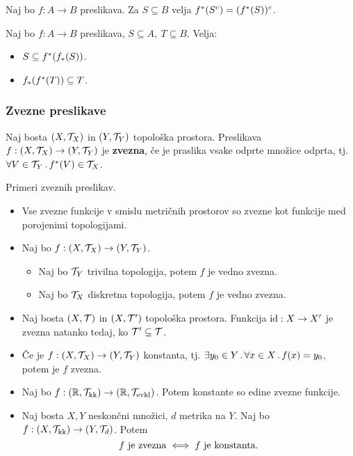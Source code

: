 \begin{trditev}
    Naj bo $f: A \to B$ preslikava. Za $S \subseteq B$ velja $f^{*}(S^c) = (f^{*}(S))^c$.
\end{trditev}

\begin{trditev}
    Naj bo $f: A \to B$ preslikava, $S \subseteq A, \ T \subseteq B$. Velja:
    \begin{itemize}
        \item $S \subseteq f^{*}(f_{*}(S))$.
        \item $f_{*}(f^{*}(T)) \subseteq T$.
    \end{itemize}
\end{trditev}

\subsubsection{Zvezne preslikave}
\begin{definicija}    
    Naj bosta $(X, \mathcal{T}_X)$ in $(Y, \mathcal{T}_Y)$ topološka prostora. Preslikava $f: (X, \mathcal{T}_X) \to (Y, \mathcal{T}_Y)$ je \textbf{zvezna}, če je praslika vsake odprte množice odprta, tj. $\forall V \in \mathcal{T}_Y \,.\, f^{*}(V) \in \mathcal{T}_X$.
\end{definicija}

\begin{primer}
    Primeri zveznih preslikav.
    \begin{itemize}
        \item Vse zvezne funkcije v smislu metričnih prostorov so zvezne kot funkcije med porojenimi topologijami.
        \item Naj bo $f: (X, \mathcal{T}_X) \to (Y, \mathcal{T}_Y)$. 
        \begin{itemize}
            \item Naj bo $\mathcal{T}_Y$ trivilna topologija, potem $f$ je vedno zvezna.
            \item Naj bo $\mathcal{T}_X$ diskretna topologija, potem $f$ je vedno zvezna.
        \end{itemize}
        \item Naj bosta $(X, \mathcal{T})$ in $(X, \mathcal{T}')$ topološka prostora. Funkcija $\operatorname{id}: X \to X'$ je zvezna natanko tedaj, ko $\mathcal{T}' \subseteq \mathcal{T}$.
        \item Če je $f: (X, \mathcal{T}_X) \to (Y, \mathcal{T}_Y)$ konstanta, tj. $\exists y_0 \in Y \,.\, \forall x \in X \,.\, f(x) = y_0$, potem je $f$ zvezna.
        \item Naj bo $f: (\mathbb{R}, \mathcal{T}_{\text{kk}}) \to (\mathbb{R}, \mathcal{T}_{\text{evkl}})$. Potem konstante so edine zvezne funkcije.         
        \item Naj bosta $X, Y$ neskončni množici, $d$ metrika na $Y$. Naj bo $f: (X, \mathcal{T}_{\text{kk}}) \to (Y, \mathcal{T}_d)$. Potem 
        $$f \text{ je zvezna} \iff f \text{ je konstanta}.$$
    \end{itemize}
\end{primer}

